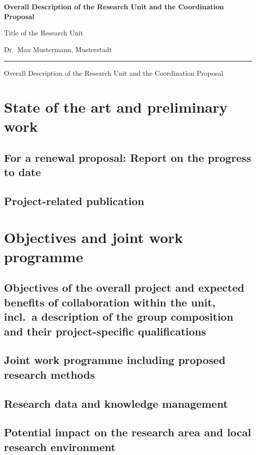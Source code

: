 \documentclass{scrartcl}
\newcommand{\spokesperson}{Dr.\ Max Mustermann, Musterstadt}
\newcommand{\project}{Title of the Research Unit}
\begin{document}
{\raggedright{} \normalsize \bfseries
	Overall Description of the Research Unit and the Coordination Proposal \par
    \project{} \par
    \spokesperson{} \par
	\rule{\textwidth}{0.5pt} \par
	Overall Description of the Research Unit and the Coordination Proposal
}

\section{State of the art and preliminary work}

\subsection{For a renewal proposal: Report on the progress to date}

\subsection{Project-related publication}
\printbibliography[heading=none]


\section{Objectives and joint work programme}

\subsection{Objectives of the overall project and expected benefits of collaboration within the unit, incl.\ a description of the group composition and their project-specific qualifications}

\subsection{Joint work programme including proposed research methods}

\subsection{Research data and knowledge management}

\subsection{Potential impact on the research area and local research environment}
\end{document}
